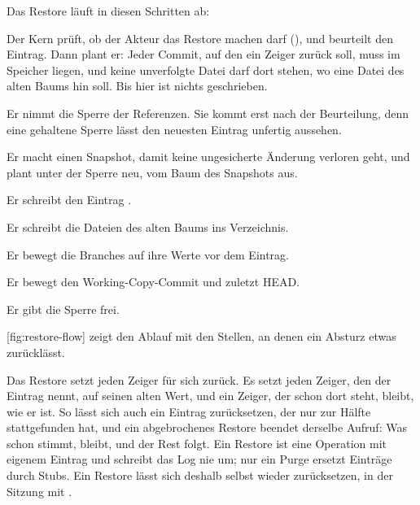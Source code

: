 {\startplacefigure[title={Zeiger vor und nach \type{op restore 5}},
    reference=fig:restore-pointers,location=here]
\stopplacefigure

Das Restore läuft in diesen Schritten ab:

\startitemize[n]
\item Der Kern prüft, ob der Akteur das Restore machen darf (),
und beurteilt den Eintrag.
Dann plant er:
Jeder Commit, auf den ein Zeiger zurück soll, muss im Speicher liegen,
und keine unverfolgte Datei darf dort stehen, wo eine Datei des alten Baums hin soll.
Bis hier ist nichts geschrieben.
\item Er nimmt die Sperre der Referenzen.
Sie kommt erst nach der Beurteilung,
denn eine gehaltene Sperre lässt den neuesten Eintrag unfertig aussehen.
\item Er macht einen Snapshot, damit keine ungesicherte Änderung verloren geht,
und plant unter der Sperre neu, vom Baum des Snapshots aus.
\item Er schreibt den Eintrag .
\item Er schreibt die Dateien des alten Baums ins Verzeichnis.
\item Er bewegt die Branches auf ihre Werte vor dem Eintrag.
\item Er bewegt den Working-Copy-Commit und zuletzt HEAD.
\item Er gibt die Sperre frei.
\stopitemize

[fig:restore-flow] zeigt den Ablauf mit den Stellen,
an denen ein Absturz etwas zurücklässt.

\startplacefigure[title={Ablauf eines Restore mit Absturzpunkten},
    reference=fig:restore-flow,location=here]
\stopplacefigure

Das Restore setzt jeden Zeiger für sich zurück.
Es setzt jeden Zeiger, den der Eintrag nennt, auf seinen alten Wert,
und ein Zeiger, der schon dort steht, bleibt, wie er ist.
So lässt sich auch ein Eintrag zurücksetzen, der nur zur Hälfte stattgefunden hat,
und ein abgebrochenes Restore beendet derselbe Aufruf:
Was schon stimmt, bleibt, und der Rest folgt.
Ein Restore ist eine Operation mit eigenem Eintrag und schreibt das Log nie um;
nur ein Purge ersetzt Einträge durch Stubs.
Ein Restore lässt sich deshalb selbst wieder zurücksetzen,
in der Sitzung mit .

}
